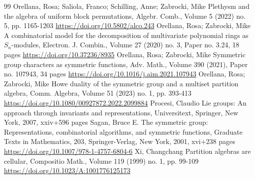 \begin{thebibliography}{99}
 Orellana, Rosa; Saliola, Franco; Schilling, Anne; Zabrocki, Mike Plethysm and the algebra of uniform block permutations, Algebr. Comb., Volume 5 (2022) no. 5, pp. 1165-1203 \url{https://doi.org/10.5802/alco.243}
 Orellana, Rosa; Zabrocki, Mike A combinatorial model for the decomposition of multivariate polynomial rings as $S_n$-modules, Electron. J. Combin., Volume 27 (2020) no. 3, Paper no. 3.24, 18 pages \url{https://doi.org/10.37236/8935}
 Orellana, Rosa; Zabrocki, Mike Symmetric group characters as symmetric functions, Adv. Math., Volume 390 (2021), Paper no. 107943, 34 pages \url{https://doi.org/10.1016/j.aim.2021.107943}
 Orellana, Rosa; Zabrocki, Mike Howe duality of the symmetric group and a multiset partition algebra, Comm. Algebra, Volume 51 (2023) no. 1, pp. 393-413 \url{https://doi.org/10.1080/00927872.2022.2099884}
 Procesi, Claudio Lie groups: An approach through invariants and representations, Universitext, Springer, New York, 2007, xxiv+596 pages
 Sagan, Bruce E. The symmetric group: Representations, combinatorial algorithms, and symmetric functions, Graduate Texts in Mathematics, 203, Springer-Verlag, New York, 2001, xvi+238 pages \url{https://doi.org/10.1007/978-1-4757-6804-6}
 Xi, Changchang Partition algebras are cellular, Compositio Math., Volume 119 (1999) no. 1, pp. 99-109 \url{https://doi.org/10.1023/A:1001776125173}
\end{thebibliography}

